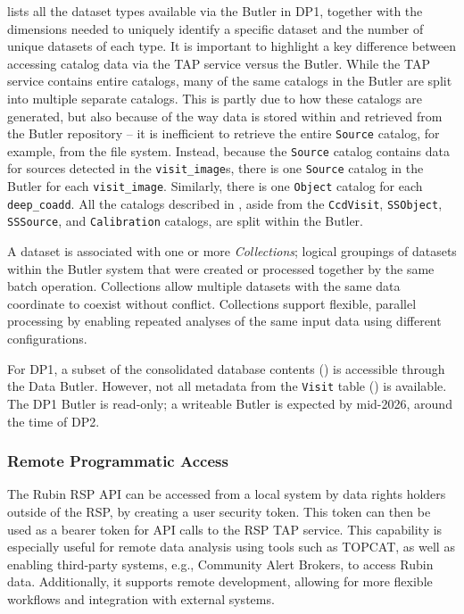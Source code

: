  lists all the dataset types available via the Butler in DP1, together with the dimensions needed to uniquely identify a specific dataset and the number of unique datasets of each type. 
It is important to highlight a key difference between accessing catalog data via the \gls{TAP} service versus the Butler. 
While the \gls{TAP} service contains entire catalogs, many of the same catalogs in the Butler are split into multiple separate catalogs. 
This is partly due to how these catalogs are generated, but also because of the way data is stored within and retrieved from the Butler repository -- it is inefficient to retrieve the entire \texttt{Source} catalog, for example, from the file system. 
Instead, because the \texttt{Source} catalog contains data for sources detected in the \texttt{visit\_image}s, there is one \texttt{Source} catalog in the Butler for each \texttt{visit\_image}. Similarly, there is one \texttt{Object} catalog for each \texttt{deep\_coadd}. 
All the catalogs described in , aside from the \texttt{CcdVisit}, \texttt{SSObject}, \texttt{SSSource}, and \texttt{Calibration} catalogs, are split within the Butler.


A dataset is associated with one or more \emph{Collections}; logical groupings of  datasets within the \gls{Butler} system that were created or processed together by the same batch operation.
Collections allow multiple datasets with the same data coordinate to coexist without conflict.
Collections support flexible, parallel processing by enabling repeated analyses of the same input data using different configurations.

For \gls{DP1}, a subset of the consolidated database contents () is accessible through the Data Butler. However, not all metadata from the \texttt{Visit} table () is available.
The \gls{DP1} Butler is read-only; a writeable Butler is expected by mid-2026, around the time of \gls{DP2}.

\subsubsection{Remote Programmatic Access}
\label{sssec:remote_api}
The Rubin \gls{RSP} \gls{API} can be accessed from a local system by data rights holders outside of the \gls{RSP}, by creating a user security token. This token can then be used as a bearer token for \gls{API} calls to the \gls{RSP} TAP service.
This capability is especially useful for remote data analysis using tools such as \gls{TOPCAT}, as well as enabling third-party systems, e.g., Community Alert Brokers, to access Rubin data. 
Additionally, it supports remote development, allowing for more flexible workflows and integration with external systems.

